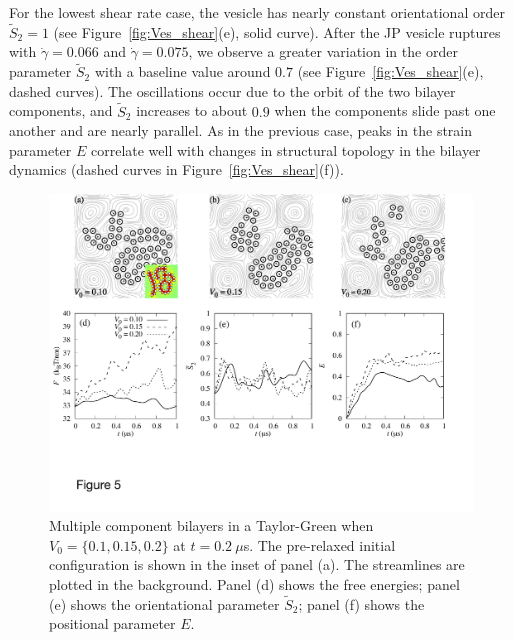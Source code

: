 \documentclass[prb,preprint,showpacs,preprintnumbers,amsmath,amssymb,longbibliography]{revtex4-1}
\begin{document}
For the lowest shear rate case, the vesicle has nearly constant
orientational order $\tilde S_2 = 1$ (see Figure~\ref{fig:Ves_shear}(e),
solid curve). After the JP vesicle ruptures with $\dot\gamma= 0.066$ and
$\dot \gamma= 0.075$, we observe a greater variation in the order
parameter $\tilde{S}_2$ with a baseline value around $0.7$ (see
Figure~\ref{fig:Ves_shear}(e), dashed curves). The oscillations occur
due to the orbit of the two bilayer components, and $\tilde{S}_2$
increases to about $0.9$ when the components slide past one another and
are nearly parallel.
%
As in the previous case, peaks in the strain parameter $E$ correlate
well with changes in structural topology in the bilayer dynamics (dashed
curves in Figure~\ref{fig:Ves_shear}(f)).


%
\begin{figure}
  \begin{center}
    \includegraphics[width=1.0\textwidth]{Figures/Figure5.pdf}    
  \end{center}
  \vspace{-20pt}  
  \caption{\label{fig:BC1_TG} Multiple component bilayers in a
  Taylor-Green when $V_0 = \{0.1, 0.15, 0.2\}$ at $t=0.2\ \mu$s. The
  pre-relaxed initial configuration is shown in the inset of panel (a).
  The streamlines are plotted in the background. Panel (d) shows the
  free energies; panel (e) shows the orientational parameter
  $\tilde{S}_2$; panel (f) shows the positional parameter $E$.}
\end{figure}
%
\end{document}
